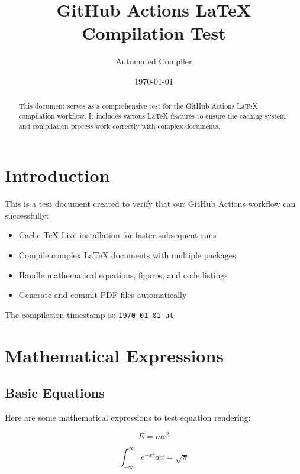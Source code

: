 \documentclass[12pt,a4paper]{article}
\title{\textbf{GitHub Actions LaTeX Compilation Test}}
\author{Automated Compiler}
\date{\today}
\begin{document}
\maketitle

\begin{abstract}
This document serves as a comprehensive test for the GitHub Actions LaTeX compilation workflow. It includes various LaTeX features to ensure the caching system and compilation process work correctly with complex documents.
\end{abstract}

\tableofcontents
\newpage

\section{Introduction}

This is a test document created to verify that our GitHub Actions workflow can successfully:
\begin{itemize}
    \item Cache TeX Live installation for faster subsequent runs
    \item Compile complex LaTeX documents with multiple packages
    \item Handle mathematical equations, figures, and code listings
    \item Generate and commit PDF files automatically
\end{itemize}

The compilation timestamp is: \texttt{\today{} at \currenttime}

\section{Mathematical Expressions}

\subsection{Basic Equations}
Here are some mathematical expressions to test equation rendering:

\begin{equation}
    E = mc^2
\end{equation}

\begin{equation}
    \int_{-\infty}^{\infty} e^{-x^2} dx = \sqrt{\pi}
\end{equation}
\end{document}
